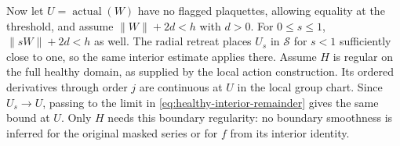Now let $U=\operatorname{actual}(W)$ have no flagged plaquettes,
allowing equality at the threshold, and assume
$\|W\|+2d<h$ with $d>0$. For $0\le s\le1$,
$\|sW\|+2d<h$ as well. The radial retreat places $U_s$ in
$\mathcal S$ for $s<1$ sufficiently close to one, so the same
interior estimate applies there. Assume $H$ is regular on the full
healthy domain, as supplied by the local action construction. Its
ordered derivatives through order $j$ are continuous at $U$ in the
local group chart. Since $U_s\to U$, passing to the limit in
\eqref{eq:healthy-interior-remainder} gives the same bound at $U$.
Only $H$ needs this boundary regularity: no boundary smoothness is
inferred for the original masked series or for $f$ from its interior
identity.

